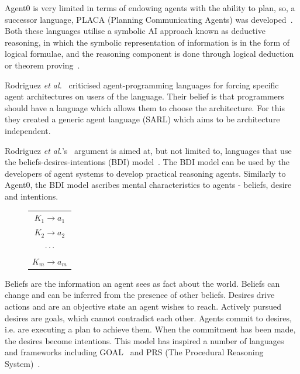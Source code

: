 \documentclass[]{final_report}
\begin{document}
Agent0 is very limited in terms of endowing agents with the ability to plan, so, a successor language, PLACA (Planning Communicating Agents) was developed~\cite{thomas1993placa}. Both these languages utilise a symbolic AI approach known as deductive reasoning, in which the symbolic representation of information is in the form of logical formulae, and the reasoning component is done through logical deduction or theorem proving~\cite{wooldridge2009introduction}.\par 
Rodriguez \textit{et al.}~\cite{rodriguez2014sarl} criticised agent-programming languages for forcing specific agent architectures on users of the language. Their belief is that programmers should have a language which allows them to choose the architecture. For this they created a generic agent language (SARL) which aims to be architecture independent.\par 
Rodriguez \textit{et al.}'s~\cite{rodriguez2014sarl} argument is aimed at, but not limited to, languages that use the beliefs-desires-intentions (BDI) model~\cite{bratman1987intention}. The BDI model can be used by the developers of agent systems to develop practical reasoning agents. Similarly to Agent0, the BDI model ascribes mental characteristics to agents - beliefs, desire and intentions.\par 
\begin{figure}
\vspace{-30pt}
\begin{framed}
	\begin{center}
		\begin{tabular}{c}
		$K_1 \rightarrow a_1$\\
		$K_2 \rightarrow a_2$\\
		$\cdot \cdot \cdot$\\
		$K_m \rightarrow a_m$
		\end{tabular}
		\label{tab:trrules}
	\end{center}	
\end{framed}
\vspace{-20pt}
\end{figure}
Beliefs are the information an agent sees as fact about the world. Beliefs can change and can be inferred from the presence of other beliefs. Desires drive actions and are an objective state an agent wishes to reach. Actively pursued desires are goals, which cannot contradict each other. Agents commit to desires, i.e. are executing a plan to achieve them. When the commitment has been made, the desires become intentions. This model has inspired a number of languages and frameworks including GOAL~\cite{hindriks2000agent} and PRS (The Procedural Reasoning System)~\cite{georgeff1987reactive}.\par 
\end{document}
